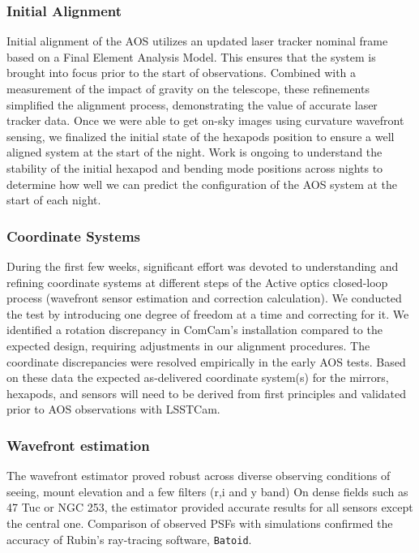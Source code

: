\subsubsection{Initial Alignment}
Initial alignment of the AOS utilizes an updated laser tracker nominal frame based on a Final Element Analysis Model.  This ensures that the system is brought into focus prior to the start of observations.  Combined with a measurement of the impact of gravity on the telescope, these refinements simplified the alignment process, demonstrating the value of accurate laser tracker data. Once we were able to get on-sky images using curvature wavefront sensing, we finalized the initial state of the hexapods position to ensure a well aligned system at the start of the night. Work is ongoing to understand the stability of the initial hexapod and bending mode positions across nights to determine how well we can predict the  configuration of the AOS system at the start of each night. 


\subsubsection{Coordinate Systems}
During the first few weeks, significant effort was devoted to understanding and refining coordinate systems at different steps of the Active optics closed-loop process (wavefront sensor estimation and correction calculation). We conducted the test by introducing one degree of freedom at a time and correcting for it. We identified a rotation discrepancy in ComCam's installation compared to the expected design, requiring 
adjustments in our alignment procedures. The coordinate discrepancies were resolved empirically in the early AOS tests. Based on these data the expected as-delivered coordinate system(s) for the mirrors, hexapods, and sensors will need to be derived from first principles and validated prior to AOS observations with LSSTCam.


\subsubsection{Wavefront estimation}
The wavefront estimator proved robust across diverse observing conditions of seeing, mount elevation and a few filters (r,i and y band) 
On dense fields such as 47 Tuc or NGC 253, the estimator provided accurate results for  all sensors except the central one.  Comparison of observed PSFs with simulations  confirmed the  accuracy of Rubin's ray-tracing software, \texttt{Batoid}.

